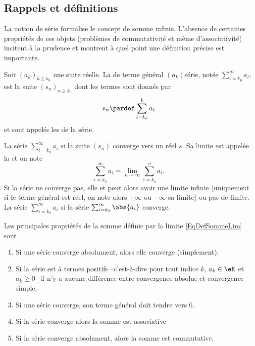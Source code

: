 \subsection{Rappels et définitions}

La notion de série formalise le concept de somme infinie. L'absence de certaines propriétés de ces objets (problèmes de commutativité et même d'associativité) incitent à la prudence et montrent à quel point une définition précise est importante.

Soit ${(a_k)}_{k \geq k_0}$ une suite réelle. La  de terme général $(a_k)${série}, notée
\begin{math}
  \sum_{i=k_0}^\infty a_i,
\end{math}
est la suite ${(s_n)}_{n \geq k_0}$ dont les termes sont donnés par
\begin{equation*}
  s_n \pardef \sum_{i=k_0}^k a_i
\end{equation*}
et sont appelés les  de la série.

La série $\sum_{i=k_0}^\infty a_i$  si la suite $(s_n)$
converge vers un réel $s$. Sa limite est appelée la  et on note
\begin{equation}        \label{EqDefSommeLim}
  \sum_{i=k_0}^\infty a_i = \lim_{n\to\infty}\sum_{i=k_0}^na_i.
\end{equation}
Si la série ne converge pas, elle  et peut alors avoir
une limite infinie (uniquement si le terme général est réel, on note
alors $+\infty$ ou $-\infty$ sa limite) ou pas de limite.  La série
$\sum_{i=k_0}^\infty a_i$  si la série
$\sum_{i=k_0}^\infty \abs{a_i}$ converge.

\begin{proposition}\label{propnseries_propdebase}
Les principales propriétés de la somme définie par la limite \eqref{EqDefSommeLim} sont
  \begin{enumerate}
  \item Si une série converge absolument, alors elle converge
    (simplement).
  \item Si la série est à termes positifs --c'est-à-dire pour tout
    indice $k$, $a_k \in \eR$ et $a_k \geq 0$-- il n'y a aucune
    différence entre convergence absolue et convergence simple.
  \item\label{point3-seriepropdebase} Si une série converge, son terme général doit tendre vers $0$.
\item 
Si la série converge alors la somme est associative
\item
Si la série converge absolument, alors la somme est commutative.
  \end{enumerate}
\end{proposition}

